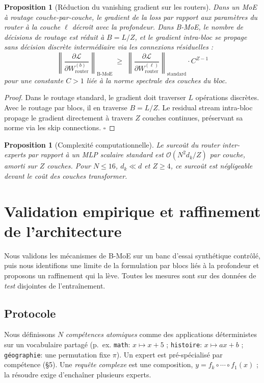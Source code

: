 \documentclass[10pt,a4paper]{article}
\newtheorem{proposition}[theorem]{Proposition}
\begin{document}
\begin{proposition}[Réduction du vanishing gradient sur les routers]
Dans un MoE à routage couche-par-couche, le gradient de la loss par rapport aux paramètres du router à la couche $\ell$ décroît avec la profondeur. Dans B-MoE, le nombre de décisions de routage est réduit à $B = L/Z$, et le gradient intra-bloc se propage sans décision discrète intermédiaire via les connexions résiduelles :
\begin{equation}
  \left\|\frac{\partial \mathcal{L}}{\partial W_{\mathrm{router}}^{(b)}}\right\|_{\mathrm{B\text{-}MoE}} \;\geq\; \left\|\frac{\partial \mathcal{L}}{\partial W_{\mathrm{router}}^{(\ell)}}\right\|_{\mathrm{standard}} \cdot C^{Z-1}
\end{equation}
pour une constante $C > 1$ liée à la norme spectrale des couches du bloc.
\end{proposition}

\begin{proof}
Dans le routage standard, le gradient doit traverser $L$ opérations discrètes. Avec le routage par blocs, il en traverse $B = L/Z$. Le residual stream intra-bloc propage le gradient directement à travers $Z$ couches continues, préservant sa norme via les skip connections. $\square$
\end{proof}

\begin{proposition}[Complexité computationnelle]
Le surcoût du router inter-experts par rapport à un MLP scalaire standard est $\mathcal{O}(N^2 d_k / Z)$ par couche, amorti sur $Z$ couches. Pour $N \leq 16$, $d_k \ll d$ et $Z \geq 4$, ce surcoût est négligeable devant le coût des couches transformer.
\end{proposition}

\section{Validation empirique et raffinement de l'architecture}
\label{sec:empirique}

Nous validons les mécanismes de B-MoE sur un banc d'essai synthétique contrôlé, puis nous identifions une limite de la formulation par blocs liés à la profondeur et proposons un raffinement qui la lève. Toutes les mesures sont sur des données de \emph{test} disjointes de l'entraînement.

\subsection{Protocole}
Nous définissons $N$ \emph{compétences atomiques} comme des applications déterministes sur un vocabulaire partagé (p.~ex. \texttt{math}: $x\mapsto x+5$ ; \texttt{histoire}: $x\mapsto ax+b$ ; \texttt{géographie}: une permutation fixe $\pi$). Un expert est pré-spécialisé par compétence (§5). Une \emph{requête complexe} est une composition, $y = f_k \circ \cdots \circ f_1(x)$ ; la résoudre exige d'enchaîner plusieurs experts.
\end{document}

